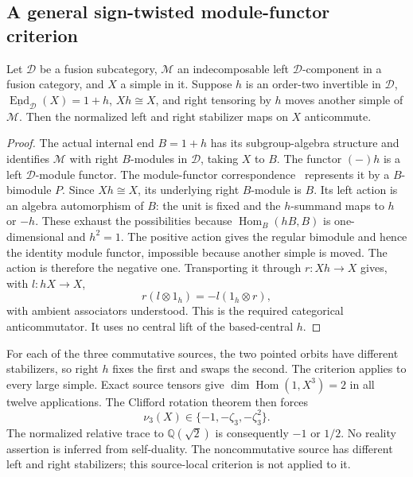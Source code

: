\subsection{A general sign-twisted module-functor criterion}
\begin{proposition}
Let $\mathcal D$ be a fusion subcategory, $\mathcal M$ an indecomposable
left $\mathcal D$-component in a fusion category, and $X$ a simple in it.
Suppose $h$ is an order-two invertible in $\mathcal D$,
$\underline{\operatorname{End}}_{\mathcal D}(X)=1+h$, $Xh\cong X$, and
right tensoring by $h$ moves another simple of $\mathcal M$.
Then the normalized left and right stabilizer maps on $X$ anticommute.
\end{proposition}
\begin{proof}
The actual internal end $B=1+h$ has its subgroup-algebra structure and
identifies $\mathcal M$ with right $B$-modules in $\mathcal D$, taking
$X$ to $B$. The functor $(-)h$ is a left $\mathcal D$-module functor.
The module-functor correspondence~\cite{RetryEGNO} represents it by a $B$-bimodule $P$. Since $Xh\cong X$,
its underlying right $B$-module is $B$. Its left action is an algebra
automorphism of $B$: the unit is fixed and the $h$-summand maps to
$h$ or $-h$. These exhaust the possibilities because
$\operatorname{Hom}_B(hB,B)$ is one-dimensional and $h^2=1$.
The positive action gives the regular bimodule and hence the identity
module functor, impossible because another simple is moved. The action
is therefore the negative one. Transporting it through $r:Xh\to X$
gives, with $l:hX\to X$,
\[
 r(l\otimes1_h)=-l(1_h\otimes r),
\]
with ambient associators understood. This is the required categorical
anticommutator. It uses no central lift of the based-central $h$.
\end{proof}

For each of the three commutative sources, the two pointed orbits have
different stabilizers, so right $h$ fixes the first and swaps the second.
The criterion applies to every large simple. Exact source tensors give
$\dim\operatorname{Hom}(1,X^3)=2$ in all twelve applications. The
Clifford rotation theorem then forces
\begin{equation}\label{eq:source-cubic-clifford}
 \nu_3(X)\in\{-1,-\zeta_3,-\zeta_3^2\}.
\end{equation}
The normalized relative trace to $\mathbb Q(\sqrt2)$ is consequently
$-1$ or $1/2$. No reality assertion is inferred from self-duality.
The noncommutative source has different left and right stabilizers;
this source-local criterion is not applied to it.


